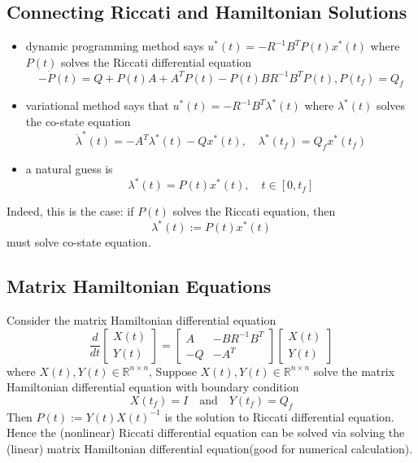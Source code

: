 \documentclass[10pt,a4paper,oneside]{article}
\begin{document}
\subsection{Connecting Riccati and Hamiltonian Solutions}
\begin{itemize}
\item dynamic programming method says $u^{*}(t)=-R^{-1} B^{T} P(t) x^{*}(t)$ where $P(t)$ solves the Riccati differential equation
$$
-\dot{P}(t)=Q+P(t) A+A^{T} P(t)-P(t) B R^{-1} B^{T} P(t), P\left(t_{f}\right)=Q_{f}
$$
\item variational method says that $u^{*}(t)=-R^{-1} B^{T} \lambda^{*}(t)$ where $\lambda^*(t)$ solves the co-state equation
$$
\dot{\lambda}^{*}(t)=-A^{T} \lambda^{*}(t)-Q x^{*}(t), \quad \lambda^{*}\left(t_{f}\right)=Q_{f} x^{*}\left(t_{f}\right)
$$
\item a natural guess is 
$$
\lambda^{*}(t)=P(t) x^{*}(t), \quad t \in\left[0, t_{f}\right]
$$ 
\end{itemize}
Indeed, this is the case: if $P(t)$ solves the Riccati equation, then
\[
\lambda^{*}(t) :=P(t) x^{*}(t)
\]
must solve co-state equation.

\subsection{Matrix Hamiltonian Equations}
Consider the matrix Hamiltonian differential equation
$$
\frac{d}{d t}\left[\begin{array}{l}{X(t)} \\ {Y(t)}\end{array}\right]=\left[\begin{array}{cc}{A} & {-B R^{-1} B^{T}} \\ {-Q} & {-A^{T}}\end{array}\right]\left[\begin{array}{l}{X(t)} \\ {Y(t)}\end{array}\right]
$$
where $X(t),Y(t)\in\mathbb{R}^{n\times n}$, Suppose $X(t),Y(t)\in\mathbb{R}^{n\times n}$ solve the matrix Hamiltonian differential equation with boundary condition 
\[
X(t_f)=I \quad \text{and} \quad Y(t_f)=Q_f
\] 
Then $P(t) :=Y(t) X(t)^{-1}$ is the solution to Riccati differential equation. Hence the (nonlinear) Riccati differential equation can be solved via solving the (linear) matrix Hamiltonian differential equation(good for numerical calculation).
\end{document}

